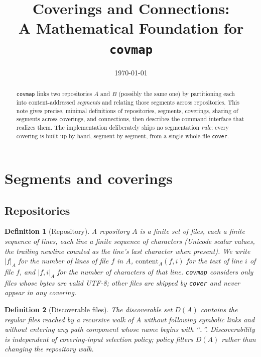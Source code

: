 \documentclass[11pt,a4paper]{article}
\title{Coverings and Connections:\\ A Mathematical Foundation for \texttt{covmap}}
\author{}
\date{\today}
\newtheorem{definition}{Definition}[section]
\begin{document}
\maketitle

\begin{abstract}
\texttt{covmap} links two repositories $A$ and $B$ (possibly the same
one) by partitioning each into content-addressed \emph{segments} and
relating those segments across repositories. This note gives precise, minimal definitions of
repositories, segments, coverings, sharing of segments across
coverings, and connections, then describes the command interface that
realizes them. The implementation deliberately ships no segmentation
\emph{rule}: every covering is built up by hand, segment by segment,
from a single whole-file \texttt{cover}.
\end{abstract}

\tableofcontents

\section{Segments and coverings}\label{sec:cov}

\subsection{Repositories}

\begin{definition}[Repository]\label{def:repo}
A \emph{repository} $A$ is a finite set of files, each a finite
sequence of lines, each line a finite sequence of characters (Unicode
scalar values, the trailing newline counted as the line's last
character when present). We write $|f|_A$ for the number of lines of
file $f$ in $A$, $\mathrm{content}_A(f, i)$ for the text of line $i$
of file $f$, and $|f, i|_A$ for the number of characters of that line.
\texttt{covmap} considers only files whose bytes are valid UTF-8;
other files are skipped by \texttt{cover} and never appear in any covering.
\end{definition}

\begin{definition}[Discoverable files]\label{def:discoverable}
The \emph{discoverable set} $D(A)$ contains the regular files reached by a
recursive walk of $A$ without following symbolic links and without entering
any path component whose name begins with ``\texttt{.}''. Discoverability is
independent of covering-input selection policy; policy filters $D(A)$ rather
than changing the repository walk.
\end{definition}
\end{document}
